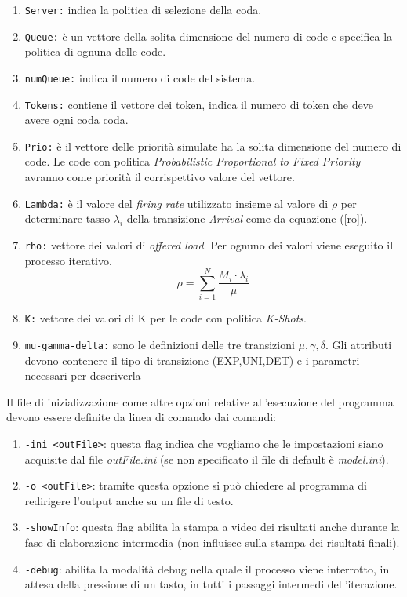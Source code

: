 \documentclass[12pt,a4paper,italian]{article}
\begin{document}
\newline
\begin{enumerate}
	\item \texttt{Server:} indica la politica di selezione della coda.
	\item \texttt{Queue:} è un vettore della solita dimensione del numero di code e specifica la politica di ognuna delle code.
	\item \texttt{numQueue:} indica il numero di code del sistema.
	\item \texttt{Tokens:} contiene il vettore dei token, indica il numero di token che deve avere ogni coda coda.
	\item \texttt{Prio:} è il vettore delle priorità simulate ha la solita dimensione del numero di code. Le code con politica \emph{Probabilistic Proportional to Fixed Priority} avranno come priorità il corrispettivo valore del vettore. 
	\item \texttt{Lambda:} è il valore del \emph{firing rate}  utilizzato insieme al valore di $\rho$ per determinare tasso $\lambda_i$ della transizione \emph{Arrival} come da equazione (\ref{ro}).
	\item \texttt{rho:} vettore dei valori di \emph{offered load}. Per ognuno dei valori viene eseguito il processo iterativo.
	\begin{equation}
	\rho = \sum_{i=1}^{N} \frac{M_i\cdot\lambda_i}{\mu}
	\label{ro}
	\end{equation}
	\item \texttt{K:} vettore dei valori di K per le code con politica \emph{K-Shots}.
	\item \texttt{mu-gamma-delta:} sono le definizioni delle tre transizioni $\mu,\gamma,\delta$. Gli attributi devono contenere il tipo di transizione (EXP,UNI,DET) e i parametri necessari per descriverla
\end{enumerate}
Il file di inizializzazione come altre opzioni relative all'esecuzione del programma devono essere definite da linea di comando dai comandi:
\begin{enumerate}
	\item \texttt{-ini <outFile>}: questa flag indica che vogliamo che le impostazioni siano acquisite dal file \emph{outFile.ini} (se non specificato il file di default è \emph{model.ini}).
	\item \texttt{-o <outFile>}: tramite questa opzione si può chiedere al programma di redirigere l'output anche su un file di testo.
	\item \texttt{-showInfo}: questa flag abilita la stampa a video dei risultati anche durante la fase di elaborazione intermedia (non influisce sulla stampa dei risultati finali).
	\item \texttt{-debug}: abilita la modalità debug nella quale il processo viene interrotto, in attesa della pressione di un tasto, in tutti i passaggi intermedi dell'iterazione. 
\end{enumerate}
\end{document}

